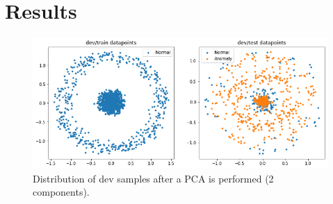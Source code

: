 \documentclass{article}
\begin{document}
\section{Results}
 \begin{figure}
    \centering
    \includegraphics[width=.7\linewidth]{assets/pca.png}
    \caption{Distribution of dev samples after a PCA is performed (2 components).}
    \label{fig:pca}
\end{figure}
\end{document}
